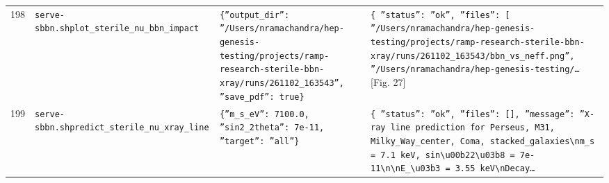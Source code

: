 \documentclass[11pt,a4paper]{article}
\begin{document}
\begin{longtable}{@{}p{}p{}p{}p{}@{}}
198 & \texttt{serve-sbbn.sh}\newline\texttt{plot\_\allowbreak{}sterile\_\allowbreak{}nu\_\allowbreak{}bbn\_\allowbreak{}impact} & \texttt{\{''output\_\allowbreak{}dir'':\allowbreak{} ''/\allowbreak{}Users/\allowbreak{}nramachandra/\allowbreak{}hep-genesis-testing/\allowbreak{}projects/\allowbreak{}ramp-research-sterile-bbn-xray/\allowbreak{}runs/\allowbreak{}261102\_\allowbreak{}163543'',\allowbreak{} ''save\_\allowbreak{}pdf'':\allowbreak{} true\}\allowbreak{}} & \texttt{\{   ''status'':\allowbreak{} ''ok'',\allowbreak{}   ''files'':\allowbreak{} [     ''/\allowbreak{}Users/\allowbreak{}nramachandra/\allowbreak{}hep-genesis-testing/\allowbreak{}projects/\allowbreak{}ramp-research-sterile-bbn-xray/\allowbreak{}runs/\allowbreak{}261102\_\allowbreak{}163543/\allowbreak{}bbn\_\allowbreak{}vs\_\allowbreak{}neff.png'',\allowbreak{}     ''/\allowbreak{}Users/\allowbreak{}nramachandra/\allowbreak{}hep-genesis-testing/\allowbreak{}\ldots{}\allowbreak{}} [Fig. 27] \\
199 & \texttt{serve-sbbn.sh}\newline\texttt{predict\_\allowbreak{}sterile\_\allowbreak{}nu\_\allowbreak{}xray\_\allowbreak{}line} & \texttt{\{''m\_\allowbreak{}s\_\allowbreak{}eV'':\allowbreak{} 7100.0,\allowbreak{} ''sin2\_\allowbreak{}2theta'':\allowbreak{} 7e-11,\allowbreak{} ''target'':\allowbreak{} ''all''\}\allowbreak{}} & \texttt{\{   ''status'':\allowbreak{} ''ok'',\allowbreak{}   ''files'':\allowbreak{} []\allowbreak{},\allowbreak{}   ''message'':\allowbreak{} ''X-ray line prediction for Perseus,\allowbreak{} M31,\allowbreak{} Milky\_\allowbreak{}Way\_\allowbreak{}center,\allowbreak{} Coma,\allowbreak{} stacked\_\allowbreak{}galaxies\textbackslash{}\allowbreak{}nm\_\allowbreak{}s =\allowbreak{} 7.1 keV,\allowbreak{} sin\textbackslash{}\allowbreak{}u00b22\textbackslash{}\allowbreak{}u03b8 =\allowbreak{} 7e-11\textbackslash{}\allowbreak{}n\textbackslash{}\allowbreak{}nE\_\allowbreak{}\textbackslash{}\allowbreak{}u03b3 =\allowbreak{} 3.55 keV\textbackslash{}\allowbreak{}nDecay\ldots{}\allowbreak{}} \\

\end{longtable}
\end{document}
